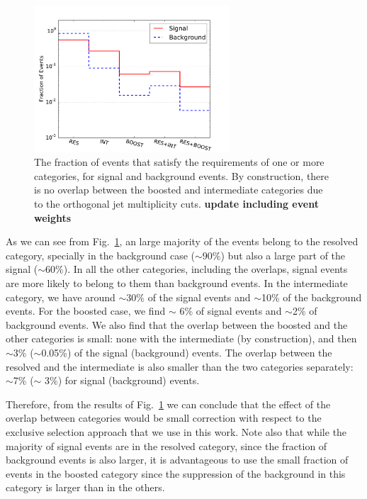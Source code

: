 \begin{figure}[t]
\begin{center}
\includegraphics[width=0.65\textwidth]{plots/overlap_categories_C1.pdf}
\caption{\small The fraction of events that satisfy the requirements
  of one or more categories, for signal and background events.
  By construction, there is no overlap between the boosted
  and intermediate categories due to the
   orthogonal jet multiplicity cuts. {\bf update including event weights}
}
\label{fig:categorisationHisto}
\end{center}
\end{figure}

As we can see from Fig.~\ref{fig:categorisationHisto}, an large majority of the events
belong to the resolved category, specially in the background case ($\sim 90\%$) but
also a large part of the signal ($\sim 60\%$).
%
In all the other categories, including
the overlaps, signal events are more likely to belong to them than
background events.
%
In the intermediate category, we have around $\sim$30\% of the signal
events and $\sim$10\% of the background events.
%
For the boosted case, we find $\sim$ 6\% of signal events and
$\sim$2\% of background events.
%
We also find that the overlap between the boosted and the other categories
is small: none with the intermediate (by construction), and then $\sim$3\%
($\sim$0.05\%) of the signal (background) events.
%
The overlap between the resolved and the intermediate is also smaller
than the two categories separately: $\sim$7\%
($\sim$ 3\%) for signal (background) events.

Therefore, from the results of Fig.~\ref{fig:categorisationHisto}
we can conclude that the effect of the overlap between categories would
be small correction with respect to the exclusive selection approach
that we use in this work.
%
Note also that while the majority of signal events are in the resolved
category, since the fraction of background events is also larger,
it is advantageous to use the small fraction of events in the boosted category
since the suppression of the background in this category is larger
than in the others.
